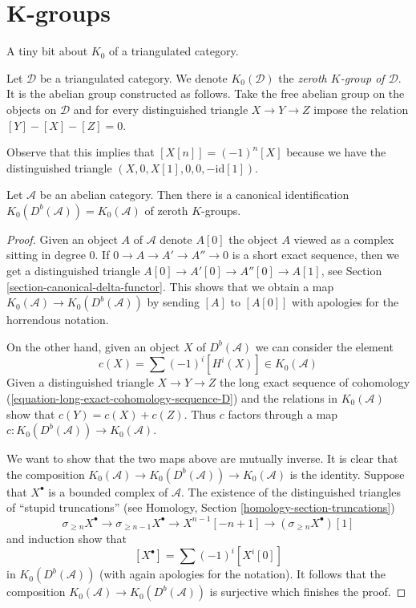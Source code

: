 \section{K-groups}
\label{section-K-groups}

\noindent
A tiny bit about $K_0$ of a triangulated category.

\begin{definition}
\label{definition-K-zero}
Let $\mathcal{D}$ be a triangulated category. We denote $K_0(\mathcal{D})$ the
{\it zeroth $K$-group of $\mathcal{D}$}. It is the abelian group constructed
as follows. Take the free abelian group on the objects on $\mathcal{D}$
and for every distinguished triangle $X \to Y \to Z$
impose the relation $[Y] - [X] - [Z] = 0$.
\end{definition}

\noindent
Observe that this implies that $[X[n]] = (-1)^n[X]$ because we have
the distinguished triangle $(X, 0, X[1], 0, 0, -\text{id}[1])$.

\begin{lemma}
\label{lemma-K-bounded-derived}
Let $\mathcal{A}$ be an abelian category. Then there is a canonical
identification $K_0(D^b(\mathcal{A})) = K_0(\mathcal{A})$
of zeroth $K$-groups.
\end{lemma}

\begin{proof}
Given an object $A$ of $\mathcal{A}$ denote $A[0]$ the object $A$
viewed as a complex sitting in degree $0$.
If $0 \to A \to A' \to A'' \to 0$ is a short
exact sequence, then we get a distinguished triangle
$A[0] \to A'[0] \to A''[0] \to A[1]$, see
Section \ref{section-canonical-delta-functor}.
This shows that we obtain a map $K_0(\mathcal{A}) \to K_0(D^b(\mathcal{A}))$
by sending $[A]$ to $[A[0]]$ with apologies for the horrendous notation.

\medskip\noindent
On the other hand, given an object $X$ of $D^b(\mathcal{A})$ we can
consider the element
$$
c(X) = \sum (-1)^i[H^i(X)] \in K_0(\mathcal{A})
$$
Given a distinguished triangle $X \to Y \to Z$ the long exact sequence
of cohomology (\ref{equation-long-exact-cohomology-sequence-D})
and the relations in $K_0(\mathcal{A})$ show that
$c(Y) = c(X) + c(Z)$. Thus $c$ factors through a map
$c : K_0(D^b(\mathcal{A})) \to K_0(\mathcal{A})$.

\medskip\noindent
We want to show that the two maps above are mutually inverse.
It is clear that the composition $K_0(\mathcal{A}) \to
K_0(D^b(\mathcal{A})) \to K_0(\mathcal{A})$ is the identity.
Suppose that $X^\bullet$ is a bounded complex of $\mathcal{A}$.
The existence of the distinguished triangles of ``stupid truncations'' (see
Homology, Section \ref{homology-section-truncations})
$$
\sigma_{\geq n}X^\bullet \to \sigma_{\geq n - 1}X^\bullet \to
X^{n - 1}[-n + 1] \to (\sigma_{\geq n}X^\bullet)[1]
$$
and induction show that
$$
[X^\bullet] = \sum (-1)^i[X^i[0]]
$$
in $K_0(D^b(\mathcal{A}))$ (with again apologies for the notation).
It follows that the composition
$K_0(\mathcal{A}) \to K_0(D^b(\mathcal{A}))$ is surjective
which finishes the proof.
\end{proof}

